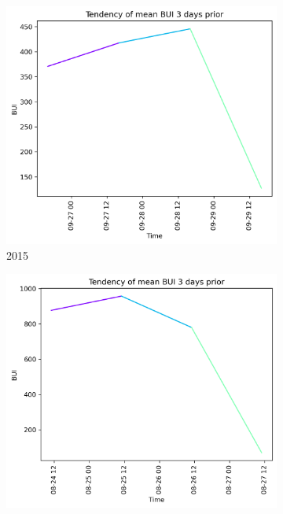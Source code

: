 \begin{figure}[h]
	\centering
	\caption{BUI values 3 days prior to wildfire}
	\begin{subfigure}{0.3\textwidth}
		\centering
		\includegraphics[width=\textwidth]{graphs/3days/2015_3daysprior_tendency_graph_BUI.png}
		\caption{2015}
		\label{fig:bui_prior_3_days_2015}
	\end{subfigure}
	\hfill
	\begin{subfigure}{0.3\textwidth}
		\centering
		\includegraphics[width=\textwidth]{graphs/3days/2019_3daysprior_tendency_graph_BUI.png}

\end{subfigure}
\end{figure}
